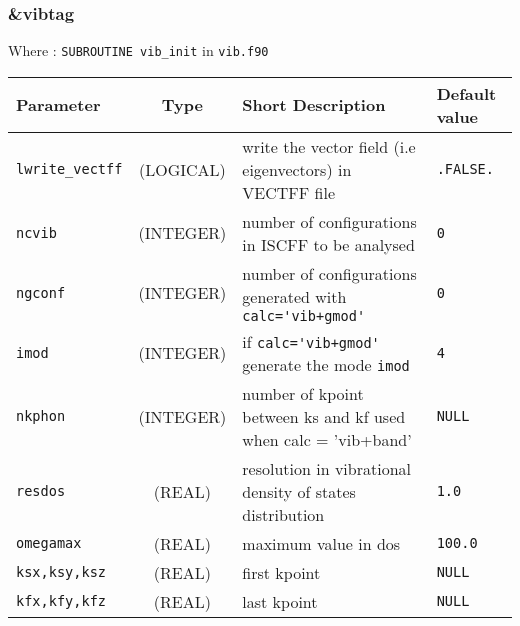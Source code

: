 \documentclass[a4paper]{article}
\begin{document}
\subsubsection{\&vibtag}

Where : \verb?SUBROUTINE vib_init? in \verb?vib.f90?
\newline

\begin{longtable}{l|c|m{8cm}|m{2cm}}
\hline
\hline
Parameter            &  Type              &          Short Description                                                          & Default value \\
\hline
\hline
\rule[-0.75cm]{0cm}{1.5cm}
\verb?lwrite_vectff? & (LOGICAL)          & write the vector field (i.e eigenvectors) in VECTFF file                            & \verb?.FALSE.?  \\
\hline
\rule[-0.75cm]{0cm}{1.5cm}
\verb?ncvib?         & (INTEGER)          & number of configurations in ISCFF to be analysed                                    & \verb?0? \\
\hline
\rule[-0.75cm]{0cm}{1.5cm}
\verb?ngconf?        & (INTEGER)          & number of configurations generated with \verb?calc='vib+gmod'?                      & \verb?0? \\
\hline
\rule[-0.75cm]{0cm}{1.5cm}
\verb?imod?          & (INTEGER)          & if \verb?calc='vib+gmod'? generate the mode \verb?imod?                             & \verb?4? \\
\hline
\rule[-0.75cm]{0cm}{1.5cm}
\verb?nkphon?        & (INTEGER)          & number of kpoint between ks and kf used when calc = 'vib+band'                      & \verb?NULL? \\
\hline
\rule[-0.75cm]{0cm}{1.5cm}
\verb?resdos?       & (REAL)              & resolution in vibrational density of states distribution                            & \verb?1.0? \\
\hline
\rule[-0.75cm]{0cm}{1.5cm}
\verb?omegamax?     & (REAL)              & maximum value in dos                                                                & \verb?100.0? \\
\hline
\rule[-0.75cm]{0cm}{1.5cm}
\verb?ksx,ksy,ksz?  & (REAL)              & first kpoint & \verb?NULL? \\
\hline
\rule[-0.75cm]{0cm}{1.5cm}
\verb?kfx,kfy,kfz?  & (REAL)              & last kpoint  & \verb?NULL? \\
\hline
\hline
\end{longtable}

\end{document}
